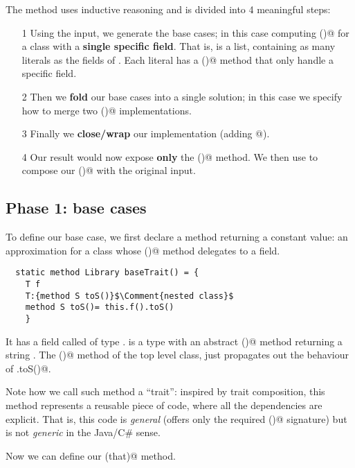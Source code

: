 The method uses inductive reasoning and is divided into 4 meaningful steps:
\begin{itemize}
\item[1] Using the input, we generate the base cases;
in this case computing \Q@toS()@ for a class with a \textbf{single specific field}.
That is, \Q@libs@ is a list, containing 
as many \Q@Library@ literals as the fields of \Q@that@.
Each literal has a \Q@toS()@ method that only handle a specific field.
\item[2] Then we  \textbf{fold} our base cases into a single solution; in this case we specify how to merge two \Q@toS()@ implementations.
\item[3] Finally we \textbf{close/wrap} our implementation (adding  \Q@[]@).
\item[4]
Our result \Q@res@ would now expose \textbf{only} the \Q@toS()@ method.
We then use \Q@Override@ to compose our \Q@toS()@ with the original input.
\end{itemize}



\subsection*{Phase 1: base cases}
To define our base case, we first 
 declare a method returning a constant \Q@Library@ value: an approximation for a class
 whose  \Q@toS()@ method delegates to a field.

\begin{lstlisting}
  static method Library baseTrait() = {
    T f
    T:{method S toS()}$\Comment{nested class}$
    method S toS()= this.f().toS()
    }
\end{lstlisting}

It has a field called \Q@f@ of type \Q@T@.
\Q@T@ is a type with an abstract \Q@toS()@ method returning a string \Q@S@.
The \Q@toS()@ method of the top level class, just propagates out
the behaviour of \Q@T.toS()@.

Note how we call such method a ``trait'': inspired by trait composition, 
this method represents a reusable piece of code, where all the dependencies are explicit.
That is, this code is \emph{general} (\Q@T@ offers only the required \Q@toS()@ signature)
but is not \emph{generic} in the Java/C\# sense.

Now we can define our \Q@baseCases(that)@ method.

